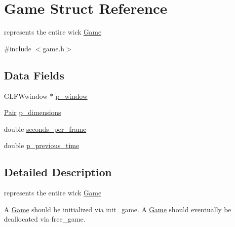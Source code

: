 \hypertarget{struct_game}{\section{Game Struct Reference}
\label{struct_game}
}


represents the entire wick \hyperlink{struct_game}{Game}  




{\ttfamily \#include $<$game.\-h$>$}

\subsection*{Data Fields}
\begin{DoxyCompactItemize}
\item 
G\-L\-F\-Wwindow $\ast$ \hyperlink{struct_game_a0bb3ad6267419b3e64cf8a7b103b4a78}{p\-\_\-window}
\item 
\hyperlink{struct_pair}{Pair} \hyperlink{struct_game_ad2cabdb62958fcfcc9ad5cc1f992d6e7}{p\-\_\-dimensions}
\item 
double \hyperlink{struct_game_ae20dfb2ebd31b51cb832c700c7ae5796}{seconds\-\_\-per\-\_\-frame}
\item 
double \hyperlink{struct_game_ac9e04dfeff5f2a4e721a96f44a5ccf5c}{p\-\_\-previous\-\_\-time}
\end{DoxyCompactItemize}


\subsection{Detailed Description}
represents the entire wick \hyperlink{struct_game}{Game} 

A \hyperlink{struct_game}{Game} should be initialized via init\-\_\-game. A \hyperlink{struct_game}{Game} should eventually be deallocated via free\-\_\-game. 

